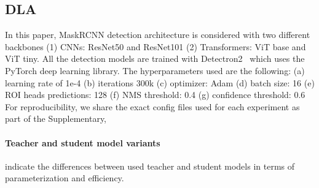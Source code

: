 \subsection{DLA}

In this paper, MaskRCNN detection architecture is considered with two different backbones (1) CNNs: ResNet50 and ResNet101 (2) Transformers: ViT base and ViT tiny. All the detection models are trained with Detectron2~\cite{wu2019detectron2} which uses the PyTorch deep learning library. The hyperparameters used are the following: (a) learning rate of 1e-4 (b) iterations 300k (c) optimizer: Adam (d) batch size: 16 (e) ROI heads predictions: 128 (f) NMS threshold: 0.4 (g) confidence threshold: 0.6
For reproducibility, we share the exact config files used for each experiment as part of the Supplementary,

\paragraph{Teacher and student model variants}  indicate the differences between used teacher and student models in terms of parameterization and efficiency.

\begin{table}[h]
  \centering
  \caption{Details of Vision Transformer model variants \cite{dosovitskiy2020image}.}
  \label{tab:vistrans}
\end{table}

